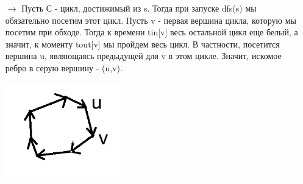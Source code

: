 \begin{itemize}
    \item [$\rightarrow$] Пусть С - цикл, достижимый из s. Тогда при запуске dfs(s) мы обязательно посетим этот цикл. Пусть v - первая вершина цикла, которую мы посетим при обходе. Тогда к времени tin[v] весь остальной цикл еще белый, а значит, к моменту tout[v] мы пройдем весь цикл. В частности, посетится вершина u, являющаясь предыдущей для v в этом цикле. Значит, искомое ребро в серую вершину - (u,v).
    
    \includegraphics[width=5cm]{images/25-28_alg9.PNG}
    

\end{itemize}
